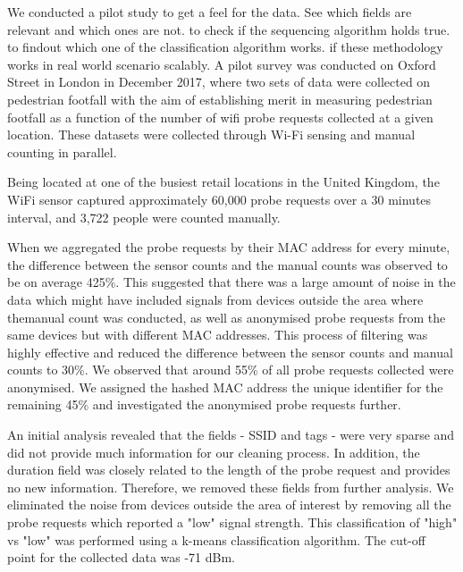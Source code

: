We conducted a pilot study to get a feel for the data.
See which fields are relevant and which ones are not.
to check if the sequencing algorithm holds true.
to findout which one of the classification algorithm works.
if these methodology works in real world scenario scalably.
A pilot survey was conducted on Oxford Street in London in December 2017,
where two sets of data were collected on pedestrian footfall
with the aim of establishing merit in measuring pedestrian footfall
as a function of the number of wifi probe requests
collected at a given location.
These datasets were collected through Wi-Fi sensing and 
manual counting in parallel.

Being located at one of the busiest retail locations in the United Kingdom, the WiFi sensor captured approximately 60,000 probe requests over a 30 minutes interval, and 3,722 people were counted manually.

When we aggregated the probe requests by their MAC address for every minute, the difference between the sensor counts and the manual counts was observed to be on average 425\%.
This suggested that there was a large amount of noise in the data which might have included signals from devices outside the area where themanual count was conducted, as well as anonymised probe requests from the same devices but with different MAC addresses.
This process of filtering was highly effective and reduced the difference between the sensor counts and manual counts to 30\%.
We observed that around 55\% of all probe requests collected were anonymised.
We assigned the hashed MAC address the unique identifier for the remaining 45\% and investigated the anonymised probe requests further.

An initial analysis revealed that the fields - SSID and tags -
were very sparse and did not provide much information for our cleaning process.
In addition, the duration field was closely related to the length of the probe request and provides no new information.
Therefore, we removed these fields from further analysis.
We eliminated the noise from devices outside the area of interest by removing all the probe requests which reported a "low" signal strength.
This classification of "high" vs "low" was performed using a k-means classification algorithm.
The cut-off point for the collected data was -71 dBm.

